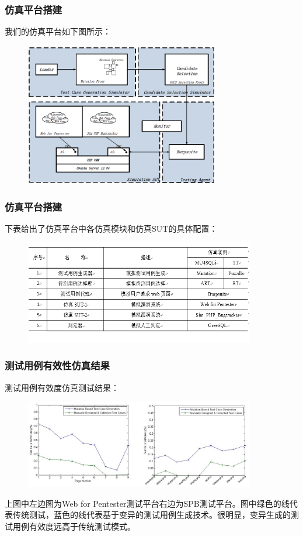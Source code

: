 \documentclass{beamer}
\begin{document}
\begin{CJK*}{UTF8}{}
\begin{frame}
\frametitle{仿真平台搭建}
我们的仿真平台如下图所示：\\
\begin{figure}  
 \centering
 \includegraphics[width=85mm]{vm.png}\\  
\end{figure}
\end{frame}
\begin{frame}
\frametitle{仿真平台搭建}
下表给出了仿真平台中各仿真模块和仿真SUT的具体配置：\\
\begin{figure}  
 \centering  
 \includegraphics[width=100mm]{5.png}\\  
\end{figure}
\end{frame}
\begin{frame}
\frametitle{测试用例有效性仿真结果}
测试用例有效度仿真测试结果：\\
\begin{figure}  
 \centering  
 \includegraphics[width=100mm]{6.png}\\  
\end{figure}
上图中左边图为Web for Pentester测试平台右边为SPB测试平台。图中绿色的线代表传统测试，蓝色的线代表基于变异的测试用例生成技术。很明显，变异生成的测试用例有效度远高于传统测试模式。
\end{frame}


\end{CJK*}
\end{document}
